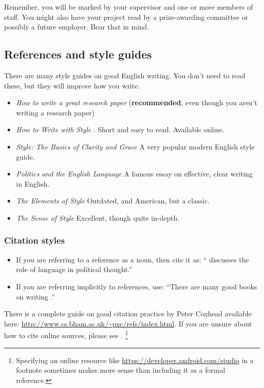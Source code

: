 \documentclass{l4proj}
\begin{document}
Remember, you will be marked by your supervisor and one or more members
of staff. You might also have your project read by a prize-awarding
committee or possibly a future employer. Bear that in mind.

\subsection{References and style guides}
There are many style guides on good English writing. You don't need to
read these, but they will improve how you write.

\begin{itemize}
    \item
    \emph{How to write a great research paper} \cite{Pey17} (\textbf{recommended}, even though you aren't writing a research paper)
    \item
    \emph{How to Write with Style} \cite{Von80}. Short and easy to read. Available online.
    \item
    \emph{Style: The Basics of Clarity and Grace} \cite{Wil09} A very popular modern English style guide.
    \item
    \emph{Politics and the English Language} \cite{Orw68}  A famous essay on effective, clear writing in English.
    \item
    \emph{The Elements of Style} \cite{StrWhi07} Outdated, and American, but a classic.
    \item
    \emph{The Sense of Style} \cite{Pin15} Excellent, though quite in-depth.
\end{itemize}

\subsubsection{Citation styles}

\begin{itemize}
\item If you are referring to a reference as a noun, then cite it as: ``\citet{Orw68} discusses the role of language in political thought.''
\item If you are referring implicitly to references, use: ``There are many good books on writing \citep{Orw68, Wil09, Pin15}.''
\end{itemize}

There is a complete guide on good citation practice by Peter Coxhead available here: \url{http://www.cs.bham.ac.uk/~pxc/refs/index.html}. 
If you are unsure about how to cite online sources, please see \citet{UNSWWebsite}. 
\footnote{Specifying an online resource like \url{https://developer.android.com/studio}
in a footnote sometimes makes more sense than including it as a formal reference.}
\end{document}

